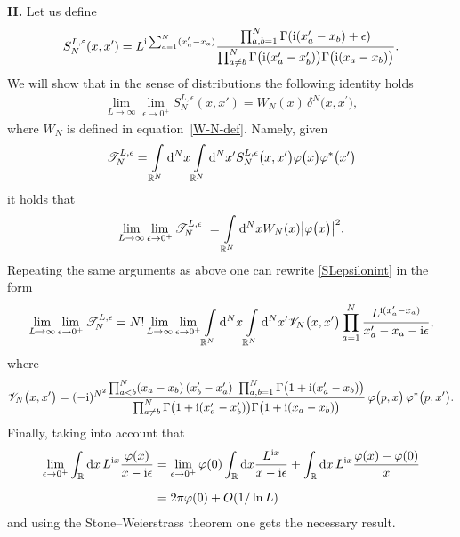 \documentclass[pdftex]{sigma}%
\numberwithin{equation}{section}
\begin{document}
\noindent
{\bf II.} Let us define
\begin{gather*}
S_N^{L,\varepsilon}(x,x')=L^{{\rm i}\sum_{a=1}^{N}(x'_a-x_a)}\frac{\prod_{a,b=1}^{N} \Gamma({\rm i}(x'_a-x_b)+\epsilon)}{\prod_{ a \not= b }^{ N }
\Gamma\big({\rm i} (x_{a}^{\prime}-x_{b}^{\prime}) \big) \Gamma\big({\rm i} (x_{a}-x_{b}) \big)}.
\end{gather*}
We will show that in the sense of distributions the following identity holds
\begin{gather*}
\lim_{L\rightarrow\infty}\lim_{\epsilon\rightarrow 0^+}S_N^{L,\epsilon}(x,x')
 =W_N(x) \, \delta^{N}\big(x,x^{\prime} \big),
\end{gather*}
where $W_N$ is defined in equation~\eqref{W-N-def}. Namely, given
\begin{gather}
\mathscr{T}_N^{L,\epsilon} = \int\limits_{\mathbb{R}^{N}}{\rm d}^{N}x
\int\limits_{\mathbb{R}^{N}}{} {\rm d}^{N}x^{\prime}
{S}_N^{L,\epsilon}\big(x,x^{\prime} \big)
\varphi\big(x\big)\varphi^{*}\big(x^{\prime}\big)
\label{SLepsilonint}
\end{gather}
it holds that
\begin{gather*}
\lim_{L\rightarrow\infty}\lim_{\epsilon \rightarrow 0^+ } \mathscr{T}_N^{L,\epsilon}   =
 \int\limits_{\mathbb{R}^{N}}{} {\rm d}^{N}x W_N(x) \big| \varphi\big(x\big) \big|^2 .
\end{gather*}
Repeating the same arguments as above one can rewrite \eqref{SLepsilonint} in the form
\begin{gather*}
\lim_{L\rightarrow\infty}\lim_{ \epsilon\rightarrow 0^+ } \mathscr{T}_N^{L,\epsilon} =
 N! \lim_{L\rightarrow\infty}\lim_{ \epsilon\rightarrow 0^+ }
 \int\limits_{\mathbb{R}^{N}}{} {\rm d}^{N}x
\int\limits_{\mathbb{R}^{N}}{} {\rm d}^{N}x^{\prime} \mathscr{V}_N \big(x,x^{\prime} \big)
\prod\limits_{a=1}^{N} \frac{ L^{{\rm i}(x'_a-x_a)} }{ x^{\prime}_a - x_a -{\rm i} \epsilon },
\end{gather*}
where
\begin{gather*}
\mathscr{V}_N\big(x,x^{\prime} \big) =(-{\rm i})^{N^2}
 \frac{ \prod_{a<b}^{N} (x_{a}-x_{b})\, (x_{b}^{\prime}-x_{a}^{\prime}) 
 \prod_{a,b=1}^{N}\Gamma\big(1+{\rm i}(x'_a-x_b)\big)}{\prod_{ a \not= b }^{ N }
\Gamma\big( 1+{\rm i} (x_{a}^{\prime}-x_{b}^{\prime}) \big) \Gamma\big( 1+{\rm i} (x_{a}-x_{b}) \big)}\,
\varphi\big(p,x\big) \, \varphi^{*}\big(p,x^{\prime}\big).
\end{gather*}
Finally, taking into account that
\begin{align*}
\lim_{\epsilon\rightarrow 0^+}\int_{\mathbb R} {\rm d}x\, L^{{\rm i}x}\frac{\varphi(x)}{x-{\rm i}\epsilon} & =
\lim_{\epsilon\rightarrow 0^+}\varphi(0)\int_{\mathbb R} {\rm d}x \frac{L^{{\rm i}x}}{x-{\rm i}\epsilon}
 + \int_{\mathbb R} {\rm d}x\, L^{{\rm i}x}\frac{\varphi(x)-\varphi(0)}{x}\notag
\\[2mm]
&=2\pi\varphi(0) + O(1/\ln L)
\end{align*}
and using the Stone--Weierstrass theorem one gets the necessary result.
\end{document}

